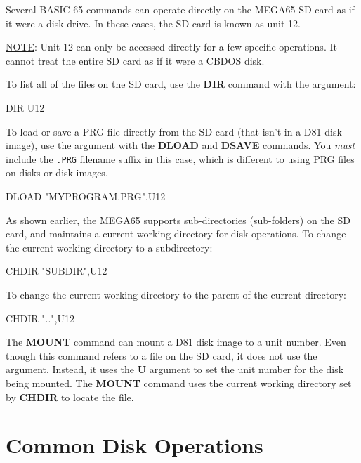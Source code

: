 Several BASIC 65 commands can operate directly on the MEGA65 SD card as if it were a disk drive. In these cases, the SD card is known as unit 12.

\underline{NOTE}: Unit 12 can only be accessed directly for a few specific operations. It cannot treat the entire SD card as if it were a CBDOS disk.

To list all of the files on the SD card, use the {\bf DIR} command with the  argument:

\begin{screencode}
DIR U12
\end{screencode}

To load or save a PRG file directly from the SD card (that isn't in a D81 disk image), use the  argument with the {\bf DLOAD} and {\bf DSAVE} commands. You {\em must} include the {\tt .PRG} filename suffix in this case, which is different to using PRG files on disks or disk images.

\begin{screencode}
DLOAD "MYPROGRAM.PRG",U12
\end{screencode}

As shown earlier, the MEGA65 supports sub-directories (sub-folders) on the SD card, and maintains a current working directory for disk operations. To change the current working directory to a subdirectory:

\begin{screencode}
CHDIR "SUBDIR",U12
\end{screencode}

To change the current working directory to the parent of the current directory:

\begin{screencode}
CHDIR "..",U12
\end{screencode}

The {\bf MOUNT} command can mount a D81 disk image to a unit number. Even though this command refers to a file on the SD card, it does not use the  argument. Instead, it uses the {\bf U} argument to set the unit number for the disk being mounted. The {\bf MOUNT} command uses the current working directory set by {\bf CHDIR} to locate the file.


\section{Common Disk Operations}

